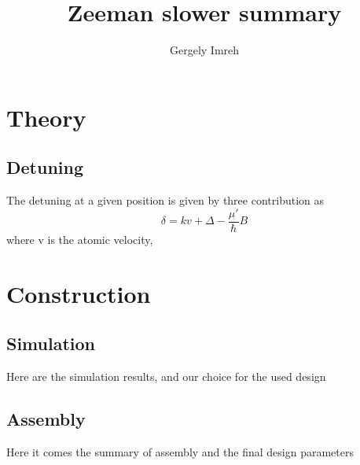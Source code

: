 \documentclass[12pt,a4paper]{article}
\author{Gergely Imreh}
\title{Zeeman slower summary}
\begin{document}
\section{Theory}

\subsection{Detuning}

The detuning at a given position is given by three contribution as
\begin{equation}
\delta = k v + \Delta - \frac{\mu'}{\hbar} B
\end{equation}
where v is the atomic velocity, 

\section{Construction}

\subsection{Simulation}

Here are the simulation results, and our choice for the used design

\subsection{Assembly}

Here it comes the summary of assembly and the final design parameters
\end{document}
